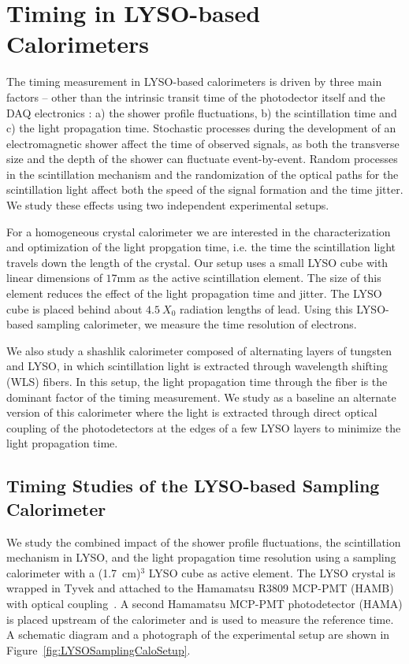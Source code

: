 \documentclass[12pt]{article}
\begin{document}
\section{Timing in LYSO-based Calorimeters}
The timing measurement in 
LYSO-based calorimeters is driven by three main factors  -- other  than the intrinsic transit time of the photodector itself and the DAQ electronics  : a) the shower profile fluctuations,  b) the scintillation time and c) the light propagation time. Stochastic processes during the
development of an electromagnetic shower affect the time of observed signals, as
both the transverse size and the depth of the shower can fluctuate event-by-event. 
Random processes in the scintillation mechanism and the randomization of
the optical paths for the scintillation light affect both the speed of the
signal formation and the time jitter. We study these effects using two
independent experimental setups. 

For a  homogeneous crystal calorimeter we are interested in the characterization and optimization of the light propgation time, i.e. the 
time the scintillation light travels  down the length of the crystal. Our setup 
uses a small LYSO cube with linear dimensions of $17\mathrm{mm}$ as the active
scintillation element. The size of this element reduces the effect of the 
light propagation time and jitter. The LYSO cube is placed behind about $4.5~X_0$ radiation
lengths of lead. Using this LYSO-based sampling calorimeter, we  measure the time
resolution of electrons.

We also study a shashlik calorimeter composed of alternating layers of
tungsten and LYSO, in which scintillation light is extracted through wavelength
shifting (WLS) fibers. In this setup, the light propagation time through the fiber is the
dominant factor of the timing measurement. We study as a baseline an alternate version of this
calorimeter where the  light is extracted through direct optical coupling of  the 
photodetectors at the edges of a few LYSO layers to minimize  the light propagation time.


\subsection{Timing Studies of the LYSO-based Sampling Calorimeter}

We study the combined impact of the shower profile fluctuations, the
scintillation mechanism in LYSO, and the light propagation time resolution
using a sampling calorimeter with a (1.7~cm)$^{3}$ LYSO cube as active
element. The LYSO crystal is wrapped in Tyvek and attached to the Hamamatsu
R3809 MCP-PMT (HAMB) with optical coupling~\cite{grease}.   A second Hamamatsu 
MCP-PMT  photodetector (HAMA)  is placed upstream of the calorimeter and is used to measure the
reference time. A schematic diagram and a photograph of the experimental setup
are shown in Figure~\ref{fig:LYSOSamplingCaloSetup}. 
\end{document}
